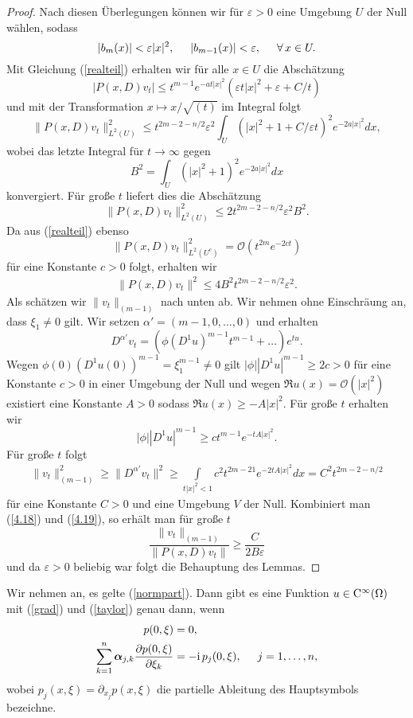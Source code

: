 \begin{proof}
Nach diesen Überlegungen können wir für $\varepsilon >0$ eine Umgebung $U$ der Null wählen, sodass
\[
|b_m(x)| < \varepsilon |x|^2, \hspace{0.5cm} |b_{m-1}(x)| < \varepsilon, \hspace{0.5cm} \forall \, x \in U.
\]
Mit Gleichung (\ref{realteil}) erhalten wir für alle $x\in U$ die Abschätzung
\[
|P(x,D)v_t| \le t^{m-1} e^{-at|x|^2}(\varepsilon t |x|^2 + \varepsilon + C/t)
\]
und mit der Transformation $x \mapsto x/\sqrt{(t)}$ im Integral folgt
\[
\lVert P(x,D) v_t \rVert_{L^2(U)} ^2 \le t^{2m-2-n/2} \varepsilon^2 \int_U (|x|^2 + 1 +C/\varepsilon t)^2 e^{-2a|x|^2} dx,
\]
wobei das letzte Integral für $t \rightarrow \infty$ gegen
\[
B^2 = \int_U (|x|^2 + 1)^2 e^{-2a|x|^2} dx
\]
konvergiert. Für große $t$ liefert dies die Abschätzung
\[
\lVert P(x,D) v_t \rVert_{L^2(U)} ^2 \le 2 t^{2m-2-n/2} \varepsilon^2  B^2.
\]
Da aus (\ref{realteil}) ebenso
\[
\lVert P(x,D) v_t \rVert_{L^2(U^c)} ^2 = \mathcal{O}(t^{2m}e^{-2ct})
\]
für eine Konstante $c>0$ folgt, erhalten wir
\begin{align}
	\label{4.18}
\lVert P(x,D) v_t \rVert^2 \le 4 B^2 t^{2m-2-n/2} \varepsilon^2.
\end{align}
Als schätzen wir $\lVert v_t \rVert_{(m-1)}$ nach unten ab. Wir nehmen ohne Einschräung an, dass $\xi_1\neq 0$ gilt. Wir setzen $\alpha' = (m-1,0,\ldots,0)$ und erhalten
\[
D^{\alpha'} v_t = (\phi (D^1 u)^{m-1}t^{m-1}+ \ldots)e^{tu}.
\]
Wegen $\phi(0) (D^1u(0))^{m-1} = \xi_1^{m-1} \neq 0$ gilt $|\phi| |D^1u|^{m-1} \ge 2c > 0$ für eine Konstante $c > 0$ in einer Umgebung der Null und wegen $\Re u(x) = \mathcal{O} (|x|^2)$ existiert eine Konstante $A > 0$ sodass $\Re u(x) \ge -A |x|^2$. Für große $t$ erhalten wir
\[
|\phi| |D^1u|^{m-1} \ge ct^{m-1}e^{-tA|x|^2}.
\]
Für große $t$ folgt
\begin{align}
	\label{4.19}
\lVert v_t \rVert_{(m-1)}^2 \ge \lVert D^{\alpha'} v_t\rVert^2 \ge \int\limits_{t|x|^2 < 1}c^2t^{2m-21}e^{-2tA|x|^2} dx = C^2 t^{2m-2-n/2}
\end{align}
für eine Konstante $C > 0$ und eine Umgebung $V$ der Null. Kombiniert man (\ref{4.18}) und (\ref{4.19}), so erhält man für große $t$
\[
\dfrac{\lVert v_t \rVert_{(m-1)}}{\lVert P(x,D) v_t \rVert} \ge \dfrac{C}{2B\varepsilon}
\]
und da $\varepsilon>0$ beliebig war folgt die Behauptung des Lemmas.
\end{proof}

\begin{lem}\label{lem2}
Wir nehmen an, es gelte (\ref{normpart}). Dann gibt es eine Funktion $u \in \mathrm C^\infty(\Omega)$ mit (\ref{grad}) und (\ref{taylor}) genau dann, wenn
\begin{align}
	\label{4.15}
p(0, \xi) &= 0, \\ 	\label{4.16}
\sum_{k=1}^{n} \boldsymbol\alpha_{j,k}\frac{\partial p(0,\xi)}{\partial \xi_k} &= -\mathrm i\,  p_j(0,\xi), \hspace{0.5cm} j=1, \ldots, n, 
\end{align}
wobei $ p_j(x,\xi) = \partial_{x_j}  p(x,\xi)$ die partielle Ableitung des Hauptsymbols bezeichne.
\end{lem}

